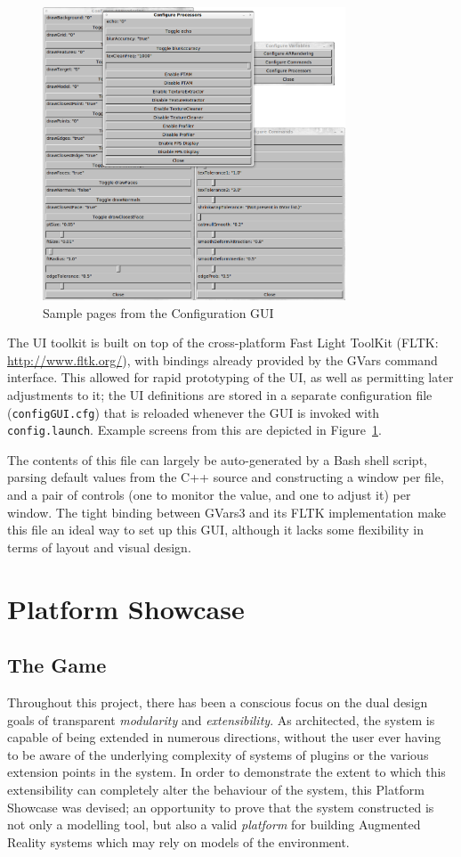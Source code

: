 \documentclass[a4paper,10pt]{report}
\begin{document}
\begin{figure}
  \begin{center}
    \includegraphics[width=340px]{Config}
  \end{center}
  \caption{Sample pages from the Configuration GUI}
  \label{configui}
\end{figure}

The UI toolkit is built on top of the cross-platform Fast Light ToolKit (FLTK: \url{http://www.fltk.org/}), with bindings already provided by the GVars command interface. This allowed for rapid prototyping of the UI, as well as permitting later adjustments to it; the UI definitions are stored in a separate configuration file (\texttt{configGUI.cfg}) that is reloaded whenever the GUI is invoked with \texttt{config.launch}. Example screens from this are depicted in Figure~\ref{configui}.

The contents of this file can largely be auto-generated by a Bash shell script, parsing default values from the C++ source and constructing a window per file, and a pair of controls (one to monitor the value, and one to adjust it) per window. The tight binding between GVars3 and its FLTK implementation make this file an ideal way to set up this GUI, although it lacks some flexibility in terms of layout and visual design.

\clearpage

\chapter{Platform Showcase}
\section{The Game}
Throughout this project, there has been a conscious focus on the dual design goals of transparent \textit{modularity} and \textit{extensibility}. As architected, the system is capable of being extended in numerous directions, without the user ever having to be aware of the underlying complexity of systems of plugins or the various extension points in the system. In order to demonstrate the extent to which this extensibility can completely alter the behaviour of the system, this Platform Showcase was devised; an opportunity to prove that the system constructed is not only a modelling tool, but also a valid \textit{platform} for building Augmented Reality systems which may rely on models of the environment.
\end{document}
